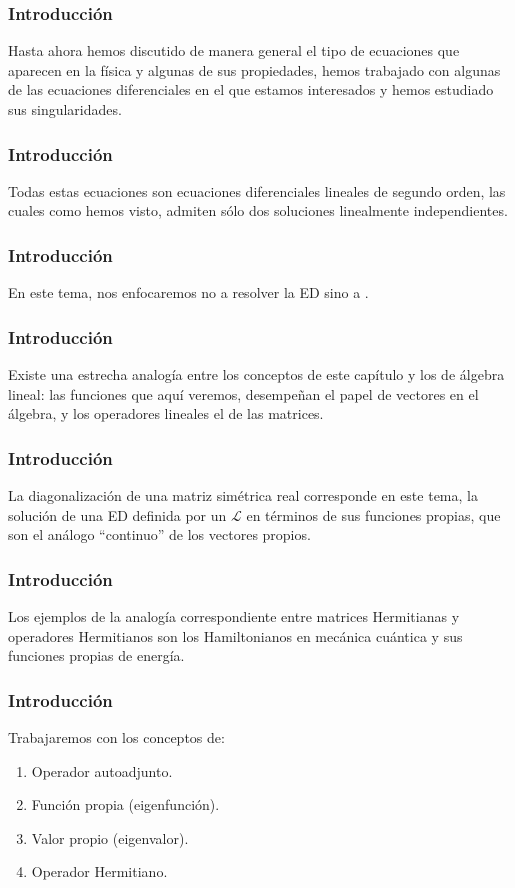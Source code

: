 \begin{frame}
\frametitle{Introducción}
Hasta ahora hemos discutido de manera general el tipo de ecuaciones que aparecen en la física y algunas de sus propiedades, hemos trabajado con algunas de las ecuaciones diferenciales en el que estamos interesados y hemos estudiado sus singularidades.
\end{frame}
\begin{frame}
\frametitle{Introducción}
Todas estas ecuaciones son ecuaciones diferenciales lineales de segundo orden, las cuales como hemos visto, admiten sólo dos soluciones linealmente independientes.
\end{frame}
\begin{frame}
\frametitle{Introducción}
En este tema, nos enfocaremos no a resolver la ED sino a .
\end{frame}
\begin{frame}
\frametitle{Introducción}
Existe una estrecha analogía entre los conceptos de este capítulo y los de álgebra lineal: \pause las funciones que aquí veremos, desempeñan el papel de vectores en el álgebra, y los operadores lineales el de las matrices.
\end{frame}
\begin{frame}
\frametitle{Introducción}
La diagonalización de una matriz simétrica real corresponde en este tema, la solución de una ED definida por un  $\mathcal{L}$ en términos de sus funciones propias, que son el análogo \enquote{continuo} de los vectores propios.
\end{frame}
\begin{frame}
\frametitle{Introducción}
Los ejemplos de la analogía correspondiente entre matrices Hermitianas y operadores Hermitianos son los Hamiltonianos en mecánica cuántica y sus funciones propias de energía.
\end{frame}
\begin{frame}
\frametitle{Introducción}
Trabajaremos con los conceptos de:
\begin{enumerate}[<+->]
\item Operador autoadjunto.
\item Función propia (eigenfunción).
\item Valor propio (eigenvalor).
\item Operador Hermitiano.
\end{enumerate}
\end{frame}
